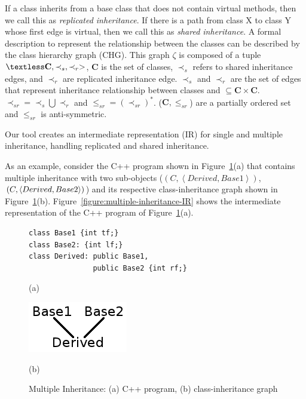 \documentclass[a4paper]{llncs}
\begin{document}
If a class inherits from a base class that does not contain virtual methods,
then we call this as \textit{replicated inheritance}. If there is a path from
class X to class Y whose first edge is virtual, then we call this as \textit{shared inheritance}.
A formal description to represent the relationship between the classes
can be described by the class hierarchy graph (CHG). This graph $\zeta$ is composed of a tuple
$ \textless \textbf{C}, \prec_{s}, \prec_{r}>$, \textbf{C} is the set of classes,
$\prec_s $ refers to shared inheritance edges, and $\prec_r$ are replicated inheritance edge.
$\prec_{s}$ and $\prec_{r}$ are the set of edges that represent inheritance relationship between
classes and $\subseteq \textbf{C} \times \textbf{C}$.
$\prec_{sr} = \prec_s \bigcup \prec_r$ and $\leq_{sr} = (\prec_{sr})^*$. ($\textbf{C}, \leq_{sr}$)
are a partially ordered set and $\leq_{sr}$ is anti-symmetric.

Our tool creates an intermediate representation (IR) for single and multiple inheritance, handling
replicated and shared inheritance.

As an example, consider the C++ program shown in Figure~\ref{fig:multiple-inheritance-graph}(a)
that contains multiple inheritance with two sub-objects
($\left(C, \left\langle Derived, Base1 \right\rangle \right)$,
$\left(C, \left\langle Derived, \\ Base2 \right\rangle \right)$)
and its respective class-inheritance graph shown in Figure~\ref{fig:multiple-inheritance-graph}(b).
Figure~\ref{figure:multiple-inheritance-IR} shows the intermediate representation of the C++ program
of Figure~\ref{fig:multiple-inheritance-graph}(a).

\begin{figure}[h]

\begin{minipage}[b]{.6\linewidth}
\begin{lstlisting}
class Base1 {int tf;}
class Base2: {int lf;}
class Derived: public Base1,
               public Base2 {int rf;}
\end{lstlisting}
  \centerline{(a)}\medskip
\end{minipage}
\label{figure:multiple-inheritance-code}
%
\begin{minipage}[b]{.48\linewidth}
  \centering
  \centerline{\includegraphics[scale=0.5]{figures/multiple_inheritance_graph}}
  \centerline{(b)}\medskip
\end{minipage}
%
\caption{Multiple Inheritance: (a) C++ program, (b) class-inheritance graph}
\label{fig:multiple-inheritance-graph}
\end{figure}
\end{document}
